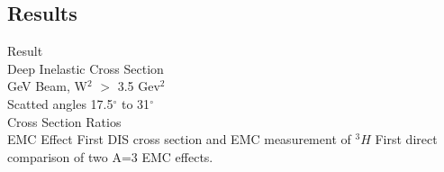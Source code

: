\documentclass[12pt,usenames,dvipsnames]{beamer}
\begin{document}
\subsection[Results]{Results}
\begin{frame}
\Huge{Result}\\
\Large{Deep Inelastic Cross Section}\\
 GeV Beam, W$^2$ $>$ 3.5 Gev$^2$\\
\qquad Scatted angles 17.5$^\circ$ to 31$^\circ$\\
\Large{Cross Section Ratios}\\
\Large{EMC Effect}
\Large{First DIS cross section and EMC measurement of $^3H$}
\Large{First direct comparison of two A=3 EMC effects.}


\end{frame}
\end{document}
